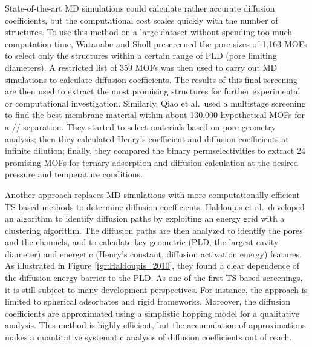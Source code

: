 \documentclass[main.tex]{subfiles}
\begin{document}
State-of-the-art MD simulations could calculate rather accurate diffusion coefficients, but the computational cost scales quickly with the number of structures. To use this method on a large dataset without spending too much computation time, Watanabe and Sholl prescreened the pore sizes of 1,163 MOFs to select only the structures within a certain range of PLD (pore limiting diameters).\cite{Watanabe_2012} A restricted list of 359 MOFs was then used to carry out MD simulations to calculate diffusion coefficients. The results of this final screening are then used to extract the most promising structures for further experimental or computational investigation. Similarly, Qiao et al.\ used a multistage screening to find the best membrane material within about 130,000 hypothetical MOFs for a // separation.\cite{Qiao_2016} They started to select materials based on pore geometry analysis; then they calculated Henry's coefficient and diffusion coefficients at infinite dilution; finally, they compared the binary permselectivities to extract 24 promising MOFs for ternary adsorption and diffusion calculation at the desired pressure and temperature conditions.

Another approach replaces MD simulations with more computationally efficient TS-based methods to determine diffusion coefficients.
Haldoupis et al.\ developed an algorithm to identify diffusion paths by exploiting an energy grid with a clustering algorithm. The diffusion paths are then analyzed to identify the pores and the channels, and to calculate key geometric (PLD, the largest cavity diameter) and energetic (Henry's constant, diffusion activation energy) features.\cite{Haldoupis_2010}
As illustrated in Figure \ref{fgr:Haldoupis_2010}, they found a clear dependence of the diffusion energy barrier to the PLD. As one of the first TS-based screenings, it is still subject to many development perspectives. For instance, the approach is limited to spherical adsorbates and rigid frameworks. Moreover, the diffusion coefficients are approximated using a simplistic hopping model for a qualitative analysis. This method is highly efficient, but the accumulation of approximations makes a quantitative systematic analysis of diffusion coefficients out of reach.
\end{document}

